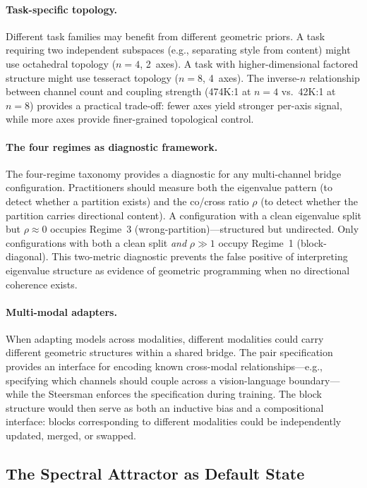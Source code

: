 \paragraph{Task-specific topology.}
Different task families may benefit from different geometric priors.
A task requiring two independent subspaces (e.g., separating style from
content) might use octahedral topology ($n{=}4$, 2~axes). A task with
higher-dimensional factored structure might use tesseract topology
($n{=}8$, 4~axes). The inverse-$n$ relationship between channel count
and coupling strength (474K:1 at $n{=}4$ vs.\ 42K:1 at $n{=}8$)
provides a practical trade-off: fewer axes yield stronger per-axis
signal, while more axes provide finer-grained topological control.

\paragraph{The four regimes as diagnostic framework.}
The four-regime taxonomy provides a diagnostic for any multi-channel
bridge configuration. Practitioners should measure both the eigenvalue
pattern (to detect whether a partition exists) and the co/cross ratio
$\rho$ (to detect whether the partition carries directional content).
A configuration with a clean eigenvalue split but $\rho \approx 0$
occupies Regime~3 (wrong-partition)---structured but undirected. Only
configurations with both a clean split \emph{and} $\rho \gg 1$ occupy
Regime~1 (block-diagonal). This two-metric diagnostic prevents the
false positive of interpreting eigenvalue structure as evidence of
geometric programming when no directional coherence exists.

\paragraph{Multi-modal adapters.}
When adapting models across modalities, different modalities could carry
different geometric structures within a shared bridge. The pair
specification provides an interface for encoding known cross-modal
relationships---e.g., specifying which channels should couple across
a vision-language boundary---while the Steersman enforces the
specification during training. The block structure would then serve as
both an inductive bias and a compositional interface: blocks
corresponding to different modalities could be independently updated,
merged, or swapped.

\subsection{The Spectral Attractor as Default State}
\label{sec:disc-attractor}

